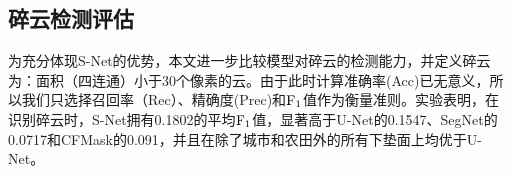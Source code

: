 \documentclass[10pt,UTF8,fntef]{ctexart}
\begin{document}
\begin{multicols}{2}


\subsection{碎云检测评估}
为充分体现S-Net的优势，本文进一步比较模型对碎云的检测能力，并定义碎云为：面积（四连通）小于30个像素的云。由于此时计算准确率(Acc)已无意义，所以我们只选择召回率（Rec）、精确度(Prec)和$\rm F_1$值作为衡量准则。实验表明，在识别碎云时，S-Net拥有0.1802的平均$\rm F_1$值，显著高于U-Net的0.1547、{\color{red}SegNet的0.0717和CFMask的0.091}，并且在除了城市和农田外的所有下垫面上均优于U-Net。

\end{multicols}
\end{document}
